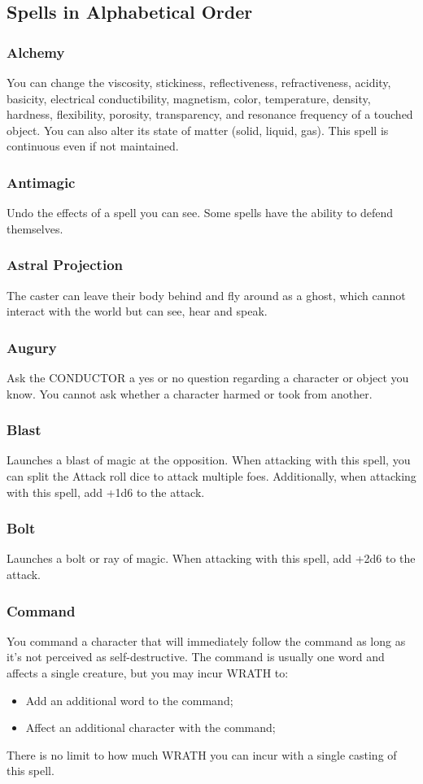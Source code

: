 \subsection{Spells in Alphabetical Order}
\begin{multicols}{3}
\subsubsection*{Alchemy}
You can change the viscosity, stickiness, reflectiveness, refractiveness, acidity, basicity, electrical conductibility, magnetism, color, temperature, density, hardness, flexibility, porosity, transparency, and resonance frequency of a touched object. You can also alter its state of matter (solid, liquid, gas). This spell is continuous even if not maintained.
\subsubsection*{Antimagic}
Undo the effects of a spell you can see. Some spells have the ability to defend themselves.
\subsubsection*{Astral Projection}
The caster can leave their body behind and fly around as a ghost, which cannot interact with the world but can see, hear and speak.
\subsubsection*{Augury}
Ask the CONDUCTOR a yes or no question regarding a character or object you know. You cannot ask whether a character harmed or took from another.
\subsubsection*{Blast}
Launches a blast of magic at the opposition. When attacking with this spell, you can split the Attack roll dice to attack multiple foes. Additionally, when attacking with this spell, add +1d6 to the attack.
\subsubsection*{Bolt}
Launches a bolt or ray of magic. When attacking with this spell, add +2d6 to the attack.
\subsubsection*{Command}
You command a character that will immediately follow the command as long as it's not perceived as self-destructive. The command is usually one word and affects a single creature, but you may incur WRATH to:
\begin{itemize}
    \item {Add an additional word to the command;}
    \item {Affect an additional character with the command;}
\end{itemize}
There is no limit to how much WRATH you can incur with a single casting of this spell.

\end{multicols}
